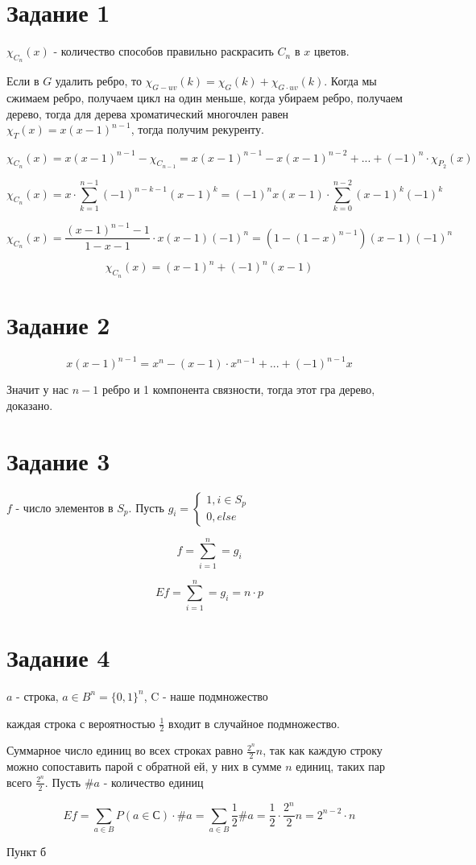 \documentclass[a4paper]{article}
\newcommand{\Sum}[2]{\sum\limits_{#1}^{#2}}
\newcommand{\task}[1]{\section*{Задание #1}}
\begin{document}
\task{1}

$\chi_{C_n}(x)$ - количество способов правильно раскрасить $C_n$ в $x$ цветов.

Если в $G$ удалить ребро, то $\chi_{G - uv} (k)= \chi_{G}(k) + \chi_{G \cdot uv}(k)$. Когда мы сжимаем ребро, получаем цикл на один меньше, когда
убираем ребро, получаем дерево, тогда для дерева хроматический многочлен равен $\chi_T(x) = x(x - 1)^{n - 1}$, тогда получим рекуренту.

$$\chi_{C_n} (x) = x(x - 1)^{n - 1} - \chi_{C_{n - 1}} = x(x - 1)^{n - 1} - x(x - 1)^{n - 2} + ... + (-1)^n \cdot \chi_{P_2}(x)$$

$$\chi_{C_n} (x) = x \cdot \Sum{k = 1}{n - 1} (-1)^{n - k - 1}(x - 1)^k = (-1)^{n}x(x - 1) \cdot \Sum{k = 0}{n - 2} (x - 1)^k (-1)^k$$

$$\chi_{C_n} (x) = \frac{(x - 1)^{n - 1} - 1}{1 - x - 1} \cdot x (x - 1) (-1)^{n} = (1 - (1 - x)^{n - 1})(x - 1)(- 1)^{n}$$

$$\chi_{C_n} (x) = (x - 1)^n + (-1)^n(x - 1)$$

\task{2}

$$x(x - 1)^{n - 1} = x^n - (x - 1)\cdot x^{n - 1} + ... + (-1)^{n - 1}x$$

Значит у нас $n - 1$ ребро и 1 компонента связности, тогда этот гра дерево, доказано.

\task{3}

$f$ - число элементов в $S_p$. Пусть $g_i = \begin{cases}
    1, i \in S_p\\
    0, else
\end{cases}$

$$f = \Sum{i = 1}{n} = g_i$$

$$Ef = \Sum{i = 1}{n} = g_i = n \cdot p$$

\task{4}

$a$ - строка, $a \in B^n = \{0, 1\}^n$, C - наше подмножество

каждая строка с вероятностью $\frac{1}{2}$ входит в случайное подмножество.

Суммарное число единиц во всех строках равно $\frac{2^n}{2} n$, так как каждую строку можно сопоставить парой с обратной ей, у них в сумме $n$ единиц,
таких пар всего $\frac{2^n}{2}$. Пусть $\#a$ - количество единиц

$$Ef = \Sum{a \in B}{} P(a \in С) \cdot \#a = \Sum{a \in B}{} \frac{1}{2} \#a = \frac{1}{2} \cdot \frac{2^n}{2} n = 2^{n - 2} \cdot n$$

Пункт б
\end{document}
